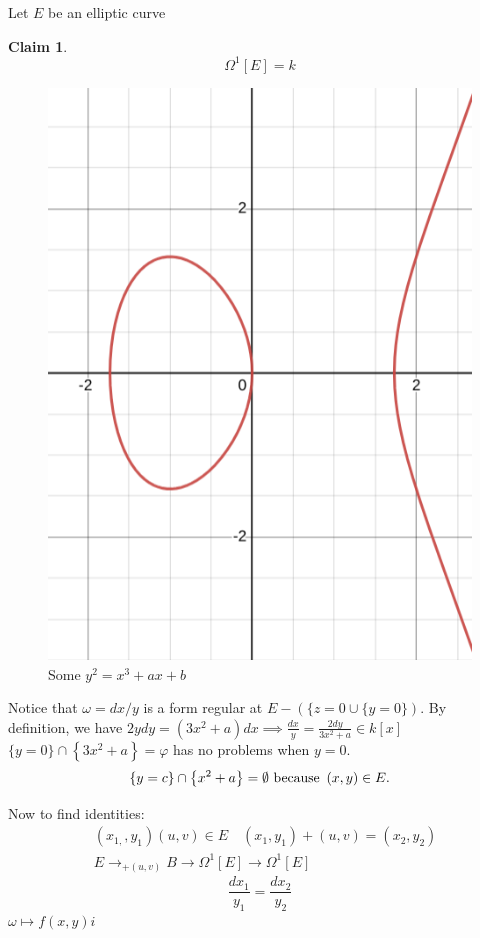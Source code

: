 \documentclass[12pt]{article}
\renewcommand{\phi}{\varphi}
\newtheorem{claim}{Claim}[section]
\begin{document}
Let $E$ be an elliptic curve
\begin{claim}
\[
\Omega^{1}[E]=k
\]
\end{claim}

\begin{figure}
	\centering
	\includegraphics{e}
	\caption{Some $y^2=x^3 +ax+b $}
\end{figure}

Notice that $\omega =d x / y$ is a form regular at $E-(\{z=0 \cup\{y=0\})$.
By definition, we have $2 y d y=\left(3 x^2+a\right) d x \implies \frac{d x}{y}=\frac{2 d y}{3 x^2+a} \in k[x]$ $\{y=0\} \cap\left\{3 x^2+a\right\}=\phi$ has no problems when $y=0 $.
\[
	\{y=c\} \cap\left\{x^2+a\right\}=\emptyset \text { because }\left(x, y\right) \in E \\
.\]

Now to find identities:
\begin{align}
& \left(x_{1,}, y_1\right)(u, v) \in E \quad\left(x_1, y_1\right)+(u, v)=\left(x_2, y_2\right) \\
& E\rightarrow_{+(u, v)} B \rightarrow \Omega^1[E] \rightarrow \Omega^1[E]
\end{align}
$$
\frac{d x_1}{y_1}=\frac{d x_2}{y_2}
$$
$\omega \longmapsto f(x, y) i$
\end{document}
